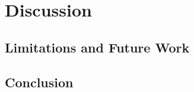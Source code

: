 \documentclass{vgtc}                          %
\begin{document}
\section{Discussion}


\subsection{Limitations and Future Work}

\subsection{Conclusion}



%

%
%
%


\end{document}
